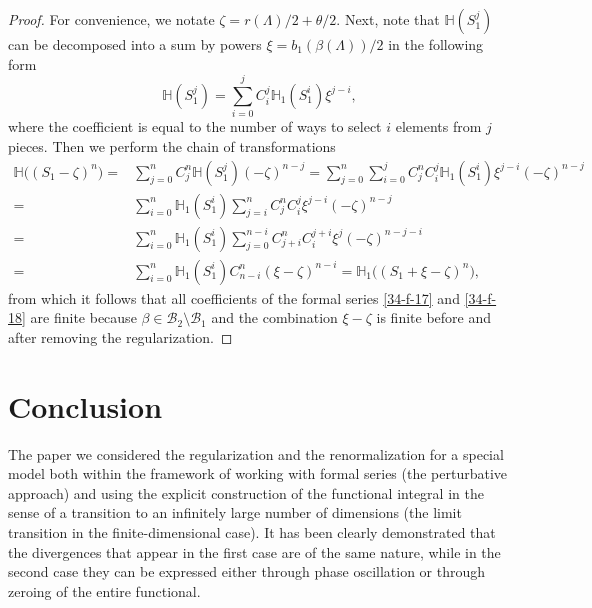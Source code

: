 \documentclass[a4paper]{article}
\begin{document}
\begin{proof} For convenience, we notate $\zeta=r(\Lambda)/2+\theta/2$. Next, note that $\mathbb{H}(S_1^j)$ can be decomposed into a sum by powers $\xi=b_1(\beta(\Lambda))/2$ in the following form
\begin{equation}\label{34-f-19}
\mathbb{H}(S_1^j)=\sum_{i=0}^jC_i^j\mathbb{H}_1(S_1^i)\xi^{j-i},
\end{equation}
where the coefficient is equal to the number of ways to select $i$ elements from $j$ pieces. Then we perform the chain of transformations
\begin{align*}
\mathbb{H}\big((S_1-\zeta)^n\big)=&\sum_{j=0}^nC_j^n\mathbb{H}(S_1^j)(-\zeta)^{n-j}=
\sum_{j=0}^n\sum_{i=0}^jC_j^nC_i^j\mathbb{H}_1(S_1^i)\xi^{j-i}(-\zeta)^{n-j}\\=&
\sum_{i=0}^n\mathbb{H}_1(S_1^i)
\sum_{j=i}^nC_j^nC_i^j\xi^{j-i}(-\zeta)^{n-j}\\=&
\sum_{i=0}^n\mathbb{H}_1(S_1^i)
\sum_{j=0}^{n-i}C_{j+i}^nC_i^{j+i}\xi^{j}(-\zeta)^{n-j-i}\\=&
\sum_{i=0}^n\mathbb{H}_1(S_1^i)C_{n-i}^n(\xi-\zeta)^{n-i}=\mathbb{H}_1\big((S_1+\xi-\zeta)^n\big),
\end{align*}
from which it follows that all coefficients of the formal series \eqref{34-f-17} and \eqref{34-f-18} are finite because $\beta\in\mathcal{B}_2\setminus\mathcal{B}_1$ and the combination $\xi-\zeta$  is finite before and after removing the regularization.
\end{proof}

\section{Conclusion}
\label{34:sec:zac}

The paper we considered the regularization and the renormalization for a special model both within the framework of working with formal series (the perturbative approach) and using the explicit construction of the functional integral in the sense of a transition to an infinitely large number of dimensions (the limit transition in the finite-dimensional case). It has been clearly demonstrated that the divergences that appear in the first case are of the same nature, while in the second case they can be expressed either through phase oscillation or through zeroing of the entire functional.
\end{document}
